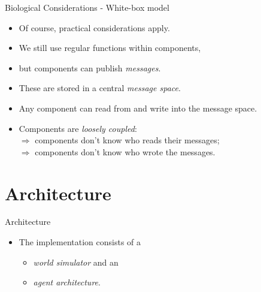 \documentclass{beamer}
\begin{document}
   \begin{frame}{Biological Considerations - White-box model}
      \begin{itemize}
         \item Of course, practical considerations apply.
         \vspace{2mm}
         \item We still use regular functions within components,
         \item but components can publish \emph{messages}.
         \item These are stored in a central \emph{message space}.
         \item Any component can read from and write into the message space.
         \vspace{2mm}
         \item Components are \emph{loosely coupled}:\\
            $\Rightarrow$ components don't know who reads their messages;\\
            $\Rightarrow$ components don't know who wrote the messages.
      \end{itemize}
   \end{frame}
   
   \section{Architecture}
   
   \begin{frame}{Architecture}
       \begin{itemize}
          \item The implementation consists of a
             \begin{itemize}
                \item \emph{world simulator} and an
                \item \emph{agent architecture}.
             \end{itemize}
       \end{itemize}
   \end{frame}
   
\end{document}
